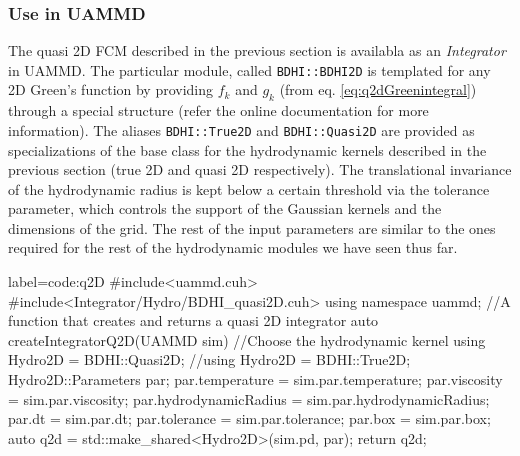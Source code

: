 \documentclass[ twoside,openright,titlepage,numbers=noenddot,%
headinclude,footinclude,cleardoublepage=empty,abstract=on,
BCOR=5mm,paper=a4,fontsize=11pt, dvipsnames
]{scrreprt}
\def\ucpp{uammd_cpp_lexer.py:UAMMDCppLexer -x}
\newcommand{\uammd}{\gls{UAMMD}\xspace}
\begin{document}
\subsubsection*{Use in UAMMD}
The quasi 2D \gls{FCM} described in the previous section is availabla as an \emph{Integrator} in \uammd. The particular module, called \texttt{BDHI::BDHI2D} is templated for any 2D Green's function by providing $f_k$ and $g_k$ (from eq. \eqref{eq:q2dGreenintegral}) through a special structure (refer the online documentation for more information). The aliases \texttt{BDHI::True2D} and \texttt{BDHI::Quasi2D} are provided as specializations of the base class for the hydrodynamic kernels described in the previous section (true 2D and quasi 2D respectively).
The translational invariance of the hydrodynamic radius is kept below a certain threshold via the tolerance parameter, which controls the support of the Gaussian kernels and the dimensions of the grid.
The rest of the input parameters are similar to the ones required for the rest of the hydrodynamic modules we have seen thus far.
\begin{code2}{label=code:q2D}
#include<uammd.cuh>
#include<Integrator/Hydro/BDHI_quasi2D.cuh>
using namespace uammd;
//A function that creates and returns a quasi 2D integrator
auto createIntegratorQ2D(UAMMD sim){
  //Choose the hydrodynamic kernel
  using Hydro2D = BDHI::Quasi2D;
  //using Hydro2D = BDHI::True2D;
  Hydro2D::Parameters par;
  par.temperature = sim.par.temperature;
  par.viscosity = sim.par.viscosity;
  par.hydrodynamicRadius = sim.par.hydrodynamicRadius;
  par.dt = sim.par.dt;
  par.tolerance = sim.par.tolerance;
  par.box = sim.par.box;
  auto q2d = std::make_shared<Hydro2D>(sim.pd, par);
  return q2d;
}
\end{code2}

\newpage
\end{document}
